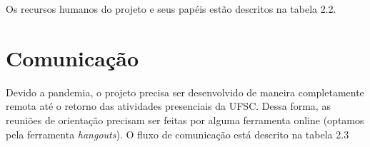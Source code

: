 Os recursos humanos do projeto e seus papéis estão descritos na tabela 2.2.

\begin{table}[H]
\centering
{}
\caption{Recursos humanos.}
\end{table}

\section{Comunicação}

Devido a pandemia, o projeto precisa ser desenvolvido de maneira completamente remota até o retorno das atividades presenciais da UFSC. Dessa forma, as reuniões de orientação precisam ser feitas por alguma ferramenta online (optamos pela ferramenta \textit{hangouts}). O fluxo de comunicação está descrito na tabela 2.3


